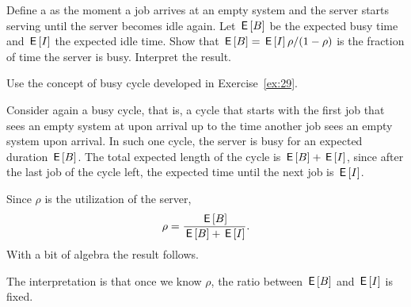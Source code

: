 \begin{exercise}[\faPhoto]\label{ex:11}
  Define a  as the moment a job arrives at an empty system and the server starts serving until the server becomes idle again.
  Let $\,\mathsf{E}\left[B\right]$ be the expected busy time and $\,\mathsf{E}\left[I\right]$  the expected idle time. Show that $\,\mathsf{E}\left[B\right] = \,\mathsf{E}\left[I\right] \rho/(1-\rho) $ is the fraction of time the server is busy. Interpret the result.
  \begin{hint}
    Use the concept of busy cycle developed in Exercise~\ref{ex:29}. 
  \end{hint}
\begin{solution}
  Consider again a busy cycle, that is, a cycle that starts with the first
  job that sees an empty system at upon arrival up to the time another
  job sees an empty system upon arrival. In such one cycle, the server
  is busy for an expected duration $\,\mathsf{E}\left[B\right]$. The total expected length
  of the cycle is $\,\mathsf{E}\left[B\right] + \,\mathsf{E}\left[I\right]$, since after the last job of the cycle
  left, the expected time until the next job is $\,\mathsf{E}\left[I\right]$.

  Since $\rho$ is the utilization of the server,
  \begin{equation*}
\rho = \frac{\,\mathsf{E}\left[B\right]}{\,\mathsf{E}\left[B\right] + \,\mathsf{E}\left[I\right]}.
  \end{equation*}
  With a bit of algebra the result follows.

  The interpretation is that once we know $\rho$, the ratio between $\,\mathsf{E}\left[B\right]$ and $\,\mathsf{E}\left[I\right]$ is fixed. 
\end{solution}
\end{exercise}




